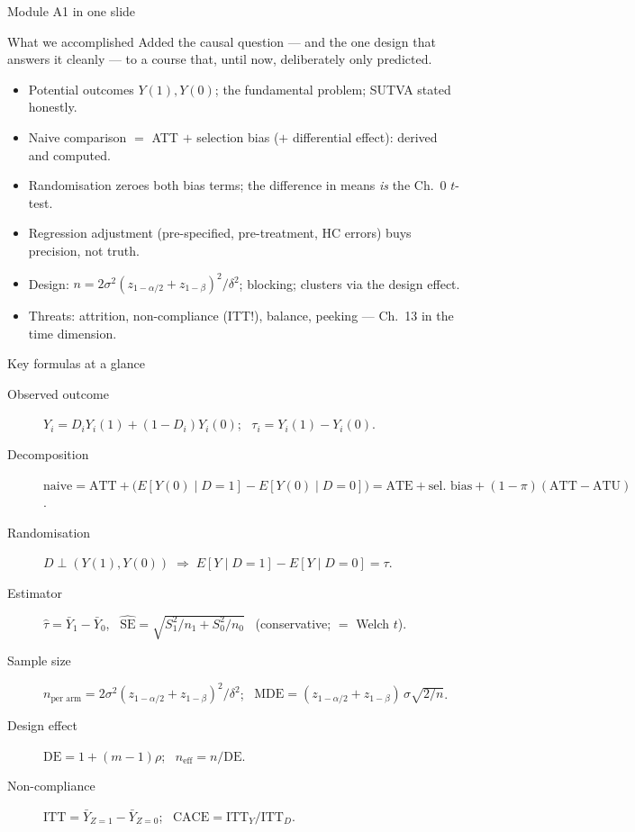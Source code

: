 \documentclass[aspectratio=169,11pt]{beamer}
\begin{document}
\begin{frame}{Module A1 in one slide}
  \begin{block}{What we accomplished}
    Added the causal question --- and the one design that answers it cleanly --- to a
    course that, until now, deliberately only predicted.
  \end{block}
  \begin{itemize}
    \item Potential outcomes $Y(1), Y(0)$; the fundamental problem; SUTVA stated honestly.
    \item Naive comparison $=$ ATT $+$ selection bias ($+$ differential effect):
          derived and computed.
    \item Randomisation zeroes both bias terms; the difference in means \emph{is} the
          Ch.~0 $t$-test.
    \item Regression adjustment (pre-specified, pre-treatment, HC errors) buys precision,
          not truth.
    \item Design: $n = 2\sigma^2(z_{1-\alpha/2}+z_{1-\beta})^2/\delta^2$; blocking;
          clusters via the design effect.
    \item Threats: attrition, non-compliance (ITT!), balance, peeking --- Ch.~13 in the
          time dimension.
  \end{itemize}
\end{frame}

\begin{frame}{Key formulas at a glance}
  \footnotesize
  \begin{description}
    \item[Observed outcome] $Y_i = D_iY_i(1) + (1-D_i)Y_i(0)$; \ $\tau_i = Y_i(1)-Y_i(0)$.
    \item[Decomposition] $\text{naive} = \text{ATT} + \big(E[Y(0)\mid D{=}1]-E[Y(0)\mid D{=}0]\big)
          = \text{ATE} + \text{sel.\ bias} + (1-\pi)(\text{ATT}-\text{ATU})$.
    \item[Randomisation] $D\perp(Y(1),Y(0)) \;\Rightarrow\; E[Y\mid D{=}1]-E[Y\mid D{=}0]=\tau$.
    \item[Estimator] $\hat\tau = \bar Y_1 - \bar Y_0$, \
          $\widehat{\mathrm{SE}} = \sqrt{S_1^2/n_1 + S_0^2/n_0}$ \ (conservative; $=$ Welch $t$).
    \item[Sample size] $n_{\text{per arm}} = 2\sigma^2(z_{1-\alpha/2}+z_{1-\beta})^2/\delta^2$; \
          $\mathrm{MDE} = (z_{1-\alpha/2}+z_{1-\beta})\,\sigma\sqrt{2/n}$.
    \item[Design effect] $\mathrm{DE} = 1+(m-1)\rho$; \ $n_{\text{eff}} = n/\mathrm{DE}$.
    \item[Non-compliance] $\mathrm{ITT} = \bar Y_{Z=1}-\bar Y_{Z=0}$; \
          $\mathrm{CACE} = \mathrm{ITT}_Y / \mathrm{ITT}_D$.
  \end{description}
\end{frame}
\end{document}
